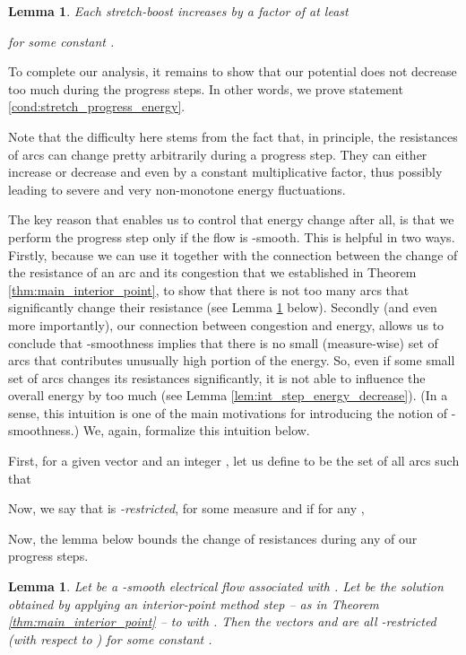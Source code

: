 \documentclass[11pt, letterpaper]{article}
\newtheorem{lemma}[theorem]{Lemma}
\begin{document}
\begin{lemma}
\label{lem:stretch_boosting_energy_increase}
Each stretch-boost increases  by a factor of at least 

for some constant .
\end{lemma}

To complete our analysis, it remains to show that our potential  does not decrease too much during the progress steps. In other words, we prove statement \eqref{cond:stretch_progress_energy}. 

Note that the difficulty here stems from the fact that, in principle, the resistances of arcs can change pretty arbitrarily during a progress step. They can either increase or decrease and even by a constant multiplicative factor, thus possibly leading to severe and very non-monotone energy fluctuations. 

The key reason that enables us to control that energy change after all, is that we perform the progress step only if the flow  is -smooth. This is helpful in two ways. Firstly, because we can use it together with the connection between the change of the resistance of an arc and its congestion that we established in Theorem \ref{thm:main_interior_point}, to show that there is not too many arcs that significantly change their resistance (see Lemma \ref{lem:bounding_smooth} below). Secondly (and even more importantly), our connection between congestion and energy, allows us to conclude that -smoothness implies that there is no small (measure-wise) set of arcs that contributes unusually high portion of the energy. So, even if some small set of arcs changes its resistances significantly, it is not able to influence the overall energy by too much (see Lemma \ref{lem:int_step_energy_decrease}). (In a sense, this intuition is one of the main motivations for introducing the notion of -smoothness.) We, again, formalize this intuition below. 

First, for a given vector  and an integer , let us define  to be the set of all arcs such that

Now, we say that  is {\em -restricted}, for some measure  and  if for any , 

Now, the lemma below bounds the change of resistances during any of our progress steps. 

\begin{lemma}
\label{lem:bounding_smooth}
Let  be a -smooth electrical flow associated with . Let  be the solution obtained by applying an interior-point method step -- as in Theorem \ref{thm:main_interior_point} -- to  with . Then the vectors  and  are all -restricted (with respect to ) for some constant .
\end{lemma}
\end{document}
